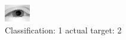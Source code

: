 \begin{figure}[h!]
\begin{center}
\includegraphics[width=0.60\columnwidth]{figures/ID2324_class_1_target_2.png}
\end{center}
\caption{ Classification: 1 actual target: 2}
\label{fig:ID2324_class_1_target_2}
\end{figure}
